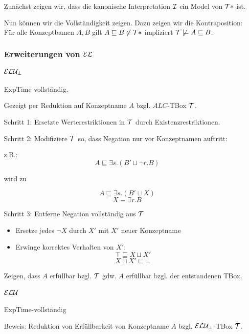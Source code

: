 Zunächst zeigen wir, dass die kanonische Interpretation $\mathcal{I}$ ein Model von $\mathcal{T} *$ ist.

Nun können wir die Vollständigkeit zeigen. Dazu zeigen wir die Kontraposition: Für alle Konzeptbamen $A,B$ gilt $A \sqsubseteq B \not\in \mathcal{T} *$ impliziert $\mathcal{T} \not\models A \sqsubseteq B$.

\subsubsection{Erweiterungen von \texorpdfstring{$\mathcal{E}\mathcal{L}$}{EL}}

\paragraph{\texorpdfstring{$\mathcal{E}\mathcal{L}\mathcal{U}_{\bot}$}{EL}}

ExpTime vollständig.

Gezeigt per Reduktion auf Konzeptname $A$ bzgl. $ALC$-TBox $\mathcal{T}$.

Schritt 1: Ersetzte Werterestriktionen in $\mathcal{T}$ durch Existenzrestriktionen.

Schritt 2: Modifiziere $\mathcal{T}$ so, dass Negation nur vor Konzeptnamen auftritt:

z.B.: $$A \sqsubseteq \exists s.(B' \sqcup \neg r.B)$$

wird zu

$$A \sqsubseteq \exists s.(B' \sqcup X)$$
$$X \equiv \exists r.B$$

Schritt 3: Entferne Negation vollständig aus $\mathcal{T}$ 

\begin{itemize}
	\item Ersetze jedes $\neg X$ durch $X'$ mit $X'$ neuer Konzeptname
	\item Erwinge korrektes Verhalten von $X'$:
	$$\top \sqsubseteq X \sqcup X'$$
	$$X \sqcap X' \sqsubseteq \bot$$
\end{itemize}

Zeigen, dass $A$ erfüllbar bzgl. $\mathcal{T}$ gdw. $A$ erfüllbar bzgl. der entstandenen TBox.

\paragraph{\texorpdfstring{$\mathcal{E}\mathcal{L}\mathcal{U}$}{EL}}

ExpTime-vollständig

Beweis: Reduktion von Erfüllbarkeit von Konzeptname $A$ bzgl. $\mathcal{E}\mathcal{L}\mathcal{U}_{\bot}$-TBox $\mathcal{T}$.

